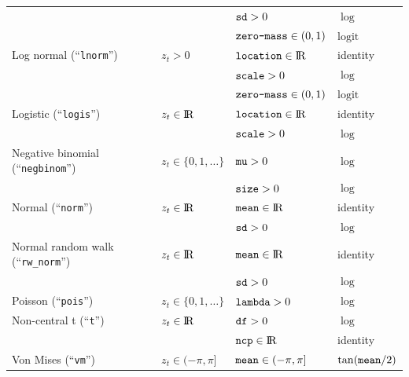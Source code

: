 \documentclass[12pt]{article}\usepackage[]{graphicx}\usepackage[]{xcolor}
\begin{document}
\begin{small}
\begin{table}
\begin{tabular}{llll}
  \rowcolor{Gray}                             &                               & $\verb|sd|>0$                                   &  $\log$ \tabularnewline  
  \rowcolor{Gray}                             &                               & $\verb|zero-mass|\in(0,1)$                      &  $\text{logit}$ \tabularnewline 
  Log normal (``\verb|lnorm|'')               & $z_t>0$                       & $\verb|location|\in{\rm I\!R}$                  &  identity \tabularnewline  
                                              &                               & $\verb|scale|>0$                                &  $\log$ \tabularnewline  
                                              &                               & $\verb|zero-mass|\in(0,1)$                      &  $\text{logit}$ \tabularnewline 
  \rowcolor{Gray} Logistic (``\verb|logis|'') & $z_t\in{\rm I\!R}$            & $\verb|location|\in{\rm I\!R}$                  &  identity \tabularnewline  
  \rowcolor{Gray}                             &                               & $\verb|scale|>0$                                &  $\log$ \tabularnewline                
  Negative binomial (``\verb|negbinom|'')     & $z_t\in\{0,1,\ldots\}$        & $\verb|mu|>0$                                   &  $\log$ \tabularnewline  
                                              &                               & $\verb|size|>0$                                 &  $\log$ \tabularnewline  
  \rowcolor{Gray} Normal (``\verb|norm|'')    & $z_t\in{\rm I\!R}$            & $\verb|mean|\in{\rm I\!R}$                      &  identity \tabularnewline  
  \rowcolor{Gray}                             &                               & $\verb|sd|>0$                                   &  $\log$ \tabularnewline 
  Normal random walk (``\verb|rw_norm|'')     & $z_t\in{\rm I\!R}$            & $\verb|mean|\in{\rm I\!R}$                      &  identity \tabularnewline  
                                              &                               & $\verb|sd|>0$                                   &  $\log$ \tabularnewline       
  \rowcolor{Gray} Poisson (``\verb|pois|'')   & $z_t\in\{0,1,\ldots\}$        & $\verb|lambda|>0$                               &  $\log$ \tabularnewline  
  Non-central t (``\verb|t|'')                & $z_t\in{\rm I\!R}$            & $\verb|df|>0$                                   &  $\log$ \tabularnewline  
                                              &                               & $\verb|ncp|\in{\rm I\!R}$                       &  identity \tabularnewline 
  \rowcolor{Gray} Von Mises (``\verb|vm|'')   & $z_t\in(-\pi,\pi]$            & $\verb|mean|\in(-\pi,\pi]$                      &  $\tan(\verb|mean|/2)$ \tabularnewline  

\end{tabular}
\end{table}
\end{small}
\end{document}
